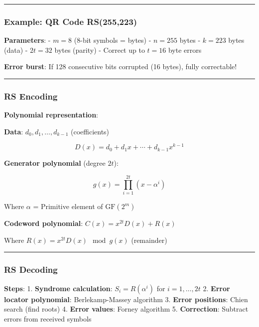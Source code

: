 \begin{center}\rule{0.5\linewidth}{0.5pt}\end{center}

\subsubsection{Example: QR Code
RS(255,223)}\label{example-qr-code-rs255223}

\textbf{Parameters}: - \(m = 8\) (8-bit symbols = bytes) - \(n = 255\)
bytes - \(k = 223\) bytes (data) - \(2t = 32\) bytes (parity) - Correct
up to \(t = 16\) byte errors

\textbf{Error burst}: If 128 consecutive bits corrupted (16 bytes),
fully correctable!

\begin{center}\rule{0.5\linewidth}{0.5pt}\end{center}

\subsubsection{RS Encoding}\label{rs-encoding}

\textbf{Polynomial representation}:

\textbf{Data}: \(d_0, d_1, \ldots, d_{k-1}\) (coefficients)

\[
D(x) = d_0 + d_1 x + \cdots + d_{k-1} x^{k-1}
\]

\textbf{Generator polynomial} (degree \(2t\)):

\[
g(x) = \prod_{i=1}^{2t} (x - \alpha^i)
\]

Where \(\alpha\) = Primitive element of \(\mathrm{GF}(2^m)\)

\textbf{Codeword polynomial}: \(C(x) = x^{2t} D(x) + R(x)\)

Where \(R(x) = x^{2t} D(x) \mod g(x)\) (remainder)

\begin{center}\rule{0.5\linewidth}{0.5pt}\end{center}

\subsubsection{RS Decoding}\label{rs-decoding}

\textbf{Steps}: 1. \textbf{Syndrome calculation}: \(S_i = R(\alpha^i)\)
for \(i = 1, \ldots, 2t\) 2. \textbf{Error locator polynomial}:
Berlekamp-Massey algorithm 3. \textbf{Error positions}: Chien search
(find roots) 4. \textbf{Error values}: Forney algorithm 5.
\textbf{Correction}: Subtract errors from received symbols

